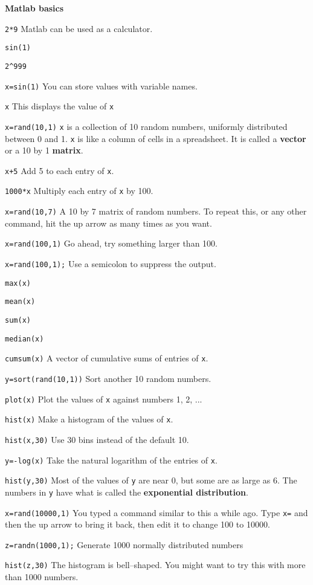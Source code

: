 \vspace*{0.2in}
\hspace*{-0.3in}
{\bf Matlab basics}
\vspace*{-0.07in}
\blist{-0.05in}
\item {\tt 2*9}       \hfill Matlab can be used as a calculator.
\item {\tt sin(1)}
\item {\tt 2\^{}999}
\item {\tt x=sin(1)}  \hfill You can store values with variable names.
\item {\tt x}         \hfill This displays the value of {\tt x}
\item {\tt x=rand(10,1)} \hfill {\tt x} is a collection of 10 random
numbers, uniformly distributed between 0 and 1.  {\tt x} is like a column
of cells in a spreadsheet.  It is called a {\bf vector} or a 10 by 1 {\bf
matrix}.
\item {\tt x+5}       \hfill Add 5 to each entry of {\tt x}.
\item {\tt 1000*x}       \hfill Multiply each entry of {\tt x} by 100.
\item {\tt x=rand(10,7)} \hfill A 10 by 7 matrix of random numbers.  To repeat this, or any other command, hit the up arrow as many times as you want.
\item {\tt x=rand(100,1)} \hfill Go ahead, try something larger than 100.
\item {\tt x=rand(100,1);} \hfill Use a semicolon to suppress the output.
\item {\tt max(x)} \hfill
\item {\tt mean(x)} \hfill
\item {\tt sum(x)} \hfill
\item {\tt median(x)} \hfill
\item {\tt cumsum(x)} \hfill A vector of cumulative sums of entries of {\tt x}.
\item {\tt y=sort(rand(10,1))} \hfill Sort another 10 random numbers.
\item {\tt plot(x)} \hfill Plot the values of {\tt x} against numbers 1, 2, ...
\item {\tt hist(x)} \hfill Make a histogram of the values of {\tt x}.
\item {\tt hist(x,30)} \hfill Use 30 bins instead of the default 10.
\item {\tt y=-log(x)} \hfill Take the natural logarithm of the entries of
{\tt x}.
\item {\tt hist(y,30)} \hfill Most of the values of {\tt y} are near 0, but
some are as large as 6.  The numbers in {\tt y} have what is called the
{\bf exponential distribution}.
\item {\tt x=rand(10000,1)} \hfill You typed a command similar to this a
while ago.  Type {\tt x=} and then the up arrow to bring it back, then edit
it to change 100 to 10000.
\item {\tt z=randn(1000,1);} \hfill Generate 1000 normally distributed numbers
\item {\tt hist(z,30)} \hfill The histogram is bell--shaped.  You might
want to try this with more than 1000 numbers.

